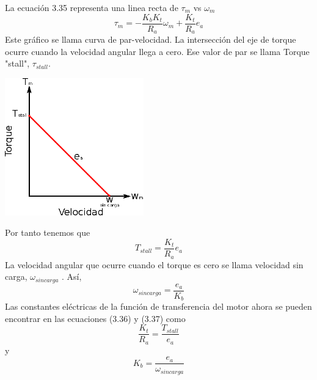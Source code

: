La ecuación 3.35 representa una linea recta de $\tau_m$ vs $\omega_m$
\begin{equation}
	\tau_m = -\frac{K_bK_t}{R_a} \omega_m + \frac{K_t}{R_a}e_a
\end{equation}
Este gráfico se llama curva de par-velocidad. La intersección del eje de torque ocurre cuando la velocidad angular llega a cero.
Ese valor de par se llama Torque "stall", $\tau_{stall}$.
\begin{center}
	\includegraphics[width=0.45\textwidth]{Contenido/Cuerpo/Capitulo3/Fig19.eps}
	\label{fig:ModeloMat:Fig1}
\end{center}
Por tanto tenemos que
\begin{equation}
	T_{stall} = \frac{K_t}{R_a}e_a
\end{equation}
La velocidad angular que ocurre cuando el torque es cero se llama velocidad sin carga, $\omega_{sin carga}$ . Así,
\begin{equation}
	\omega_{sin carga} = \frac{e_a}{K_b}
\end{equation}
Las constantes eléctricas de la función de transferencia del motor ahora se pueden encontrar en las ecuaciones (3.36) y (3.37) como
\begin{equation}
	\frac{K_t}{R_a} = \frac{T_{stall}}{e_a}
\end{equation}
y 
\begin{equation}
	K_b = \frac{e_a}{\omega_{sincarga}}
\end{equation}